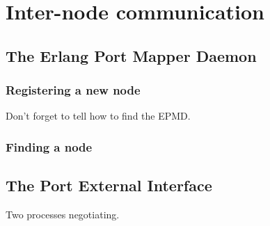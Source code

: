 %
%
%
%
%
%
%

\chapter{Inter-node communication}

\section{The Erlang Port Mapper Daemon}

\label{section:epmd}

\subsection{Registering a new node}

\label{section:epmd-register}

Don't forget to tell how to find the EPMD.

\subsection{Finding a node}

\label{section:epmd-find}

\section{The Port External Interface}

\label{chapter:port-interface}

Two  processes negotiating.

